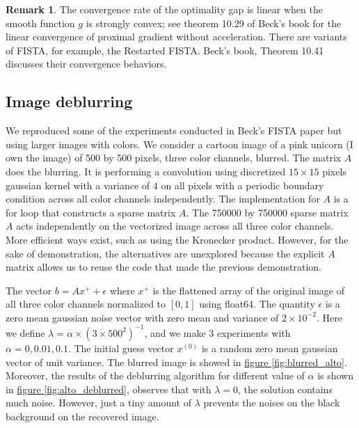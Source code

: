 \documentclass[]{article}
\theoremstyle{definition}
\newtheorem{remark}{Remark}[subsection]
{
    \newtheorem{assumption}{Assumption}
}
\begin{document}
        \begin{remark}
            The convergence rate of the optimality gap is linear when the smooth function $g$ is strongly convex; see theorem 10.29 of Beck's book\cite{book:first_order_opt} for the linear convergence of proximal gradient without acceleration. There are variants of FISTA, for example, the Restarted FISTA. Beck's book, Theorem 10.41 \cite{book:first_order_opt} discusses their convergence behaviors.
        \end{remark}
        
    \subsection*{Image deblurring}
        We reproduced some of the experiments conducted in Beck's FISTA paper \cite{paper:FISTA} but using larger images with colors. We consider a cartoon image of a pink unicorn (I own the image) of 500 by 500 pixels, three color channels, blurred. The matrix $A$ does the blurring. It is performing a convolution using discretized $15\times 15$ pixels gaussian kernel with a variance of $4$ on all pixels with a periodic boundary condition across all color channels independently. The implementation for $A$ is a for loop that constructs a sparse matrix $A$. The 750000 by 750000 sparse matrix $A$ acts independently on the vectorized image across all three color channels. More efficient ways exist, such as using the Kronecker product. However, for the sake of demonstration, the alternatives are unexplored because the explicit $A$ matrix allows us to reuse the code that made the previous demonstration. 
        \par
        The vector $b = Ax^+ + \epsilon$ where $x^+$ is the flattened array of the original image of all three color channels normalized to $[0, 1]$ using float64. The quantity $\epsilon$ is a zero mean gaussian noise vector with zero mean and variance of $2\times 10^{-2}$. Here we define $\lambda = \alpha\times (3\times500^2)^{-1}$, and we make 3 experiments with $\alpha = 0, 0.01, 0.1$. The initial guess vector $x^{(0)}$ is a random zero mean gaussian vector of unit variance. The blurred image is showed in \hyperref[fig:blurred_alto]{figure \ref*{fig:blurred_alto}}. Moreover, the results of the deblurring algorithm for different value of $\alpha$ is shown in \hyperref[fig:alto_deblurred]{figure \ref*{fig:alto_deblurred}}, observes that with $\lambda = 0$, the solution contains much noise. However, just a tiny amount of $\lambda$ prevents the noises on the black background on the recovered image. 
\end{document}
